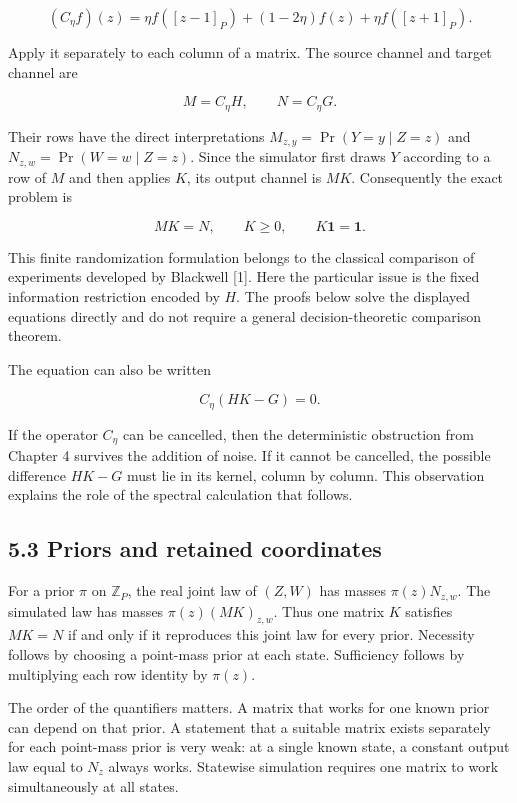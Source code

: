 \documentclass[
]{article}
\begin{document}
\[
(C_\eta f)(z)=\eta f([z-1]_P)+(1-2\eta)f(z)+\eta f([z+1]_P).
\]

Apply it separately to each column of a matrix. The source channel and
target channel are

\[
M=C_\eta H,\qquad N=C_\eta G.
\]

Their rows have the direct interpretations \(M_{z,y}=\Pr(Y=y\mid Z=z)\)
and \(N_{z,w}=\Pr(W=w\mid Z=z)\). Since the simulator first draws \(Y\)
according to a row of \(M\) and then applies \(K\), its output channel
is \(MK\). Consequently the exact problem is

\[
MK=N,\qquad K\ge0,\qquad K\mathbf1=\mathbf1.
\]

This finite randomization formulation belongs to the classical
comparison of experiments developed by Blackwell {[}1{]}. Here the
particular issue is the fixed information restriction encoded by \(H\).
The proofs below solve the displayed equations directly and do not
require a general decision-theoretic comparison theorem.

The equation can also be written

\[
C_\eta(HK-G)=0.
\]

If the operator \(C_\eta\) can be cancelled, then the deterministic
obstruction from Chapter 4 survives the addition of noise. If it cannot
be cancelled, the possible difference \(HK-G\) must lie in its kernel,
column by column. This observation explains the role of the spectral
calculation that follows.

\subsection{5.3 Priors and retained
coordinates}\label{priors-and-retained-coordinates}

For a prior \(\pi\) on \(\mathbb Z_P\), the real joint law of \((Z,W)\)
has masses \(\pi(z)N_{z,w}\). The simulated law has masses
\(\pi(z)(MK)_{z,w}\). Thus one matrix \(K\) satisfies \(MK=N\) if and
only if it reproduces this joint law for every prior. Necessity follows
by choosing a point-mass prior at each state. Sufficiency follows by
multiplying each row identity by \(\pi(z)\).

The order of the quantifiers matters. A matrix that works for one known
prior can depend on that prior. A statement that a suitable matrix
exists separately for each point-mass prior is very weak: at a single
known state, a constant output law equal to \(N_z\) always works.
Statewise simulation requires one matrix to work simultaneously at all
states.
\end{document}
